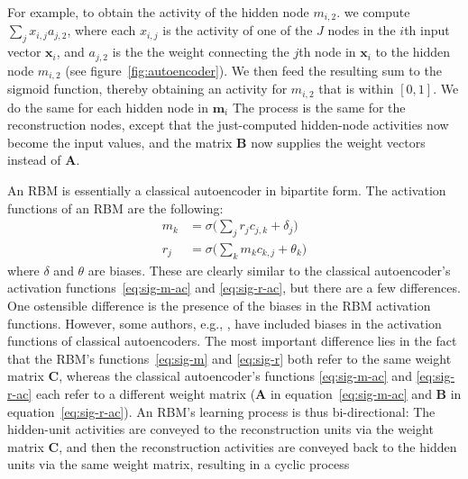 For example, to obtain the activity of the hidden node $m_{i,2}$.
we compute $\sum_{j} x_{i,j} a_{j,2}$, where each $x_{i,j}$ is the activity of one of the $J$ nodes in the $i$th input vector $\textbf{x}_i$, and $a_{j,2}$ is the the weight connecting the $j$th node in $\textbf{x}_i$ to the hidden node $m_{i,2}$ (see figure~\ref{fig:autoencoder}).
We then feed the resulting sum to the sigmoid function, thereby obtaining an activity for $m_{i,2}$ that is within $[0,1]$. 
We do the same for each hidden node in $\textbf{m}_i$
The process is the same for the reconstruction nodes, except that the just-computed hidden-node activities now become the input values, and the matrix $\textbf{B}$ now supplies the weight vectors instead of $\textbf{A}$.

An RBM is essentially a 
classical autoencoder in bipartite form.
The activation functions of an RBM are the following: 
\begin{align}
\label{eq:sig-m}
m_{k} &= \sigma\big(\sum_{j} r_{j} c_{j,k} + \delta_{j}\big) \\
\label{eq:sig-r}
r_{j} &= \sigma\big(\sum_{k}  m_{k} c_{k,j} + \theta_{k}\big)
\end{align}
where $\delta$ and $\theta$ are biases. 
These are clearly similar to the classical autoencoder's activation 
functions~\eqref{eq:sig-m-ac} and \eqref{eq:sig-r-ac},
but there are a few differences. One ostensible difference 
is the presence of the biases in the 
RBM activation functions. However, some authors, e.g., \citet{rudy-and-taylor:2014}, have included biases in the activation functions of classical autoencoders. %
The most important difference
lies in the fact that the RBM's functions~\eqref{eq:sig-m} and \eqref{eq:sig-r} 
both refer to the same weight matrix $\textbf{C}$, whereas the classical 
autoencoder's  functions \eqref{eq:sig-m-ac} and \eqref{eq:sig-r-ac} each 
refer to a different weight matrix 
($\textbf{A}$ in equation~\eqref{eq:sig-m-ac} and $\textbf{B}$ in equation~\eqref{eq:sig-r-ac}). 
An RBM's learning process is thus bi-directional: 
The hidden-unit activities are conveyed to the reconstruction 
units via the weight matrix $\textbf{C}$, and then the reconstruction 
activities are conveyed back to the hidden units via the same weight matrix, resulting in a cyclic process 

